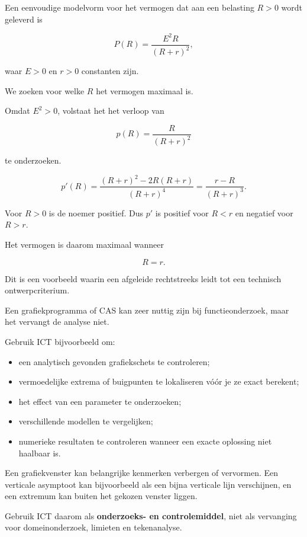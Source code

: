 \documentclass{ximera}
\begin{document}
\begin{voorbeeld}
Een eenvoudige modelvorm voor het vermogen dat aan een belasting
\(R>0\) wordt geleverd is

\[
P(R)=\frac{E^2R}{(R+r)^2},
\]

waar \(E>0\) en \(r>0\) constanten zijn.

We zoeken voor welke \(R\) het vermogen maximaal is.

Omdat \(E^2>0\), volstaat het het verloop van

\[
p(R)=\frac{R}{(R+r)^2}
\]

te onderzoeken.

\[
p'(R)
=
\frac{(R+r)^2-2R(R+r)}{(R+r)^4}
=
\frac{r-R}{(R+r)^3}.
\]

Voor \(R>0\) is de noemer positief. Dus \(p'\) is positief voor \(R<r\)
en negatief voor \(R>r\).

Het vermogen is daarom maximaal wanneer

\[
\boxed{R=r.}
\]

Dit is een voorbeeld waarin een afgeleide rechtstreeks leidt tot een
technisch ontwerpcriterium.
\end{voorbeeld}



Een grafiekprogramma of CAS kan zeer nuttig zijn bij functieonderzoek,
maar het vervangt de analyse niet.

Gebruik ICT bijvoorbeeld om:

\begin{itemize}
  \item een analytisch gevonden grafiekschets te controleren;
  \item vermoedelijke extrema of buigpunten te lokaliseren vóór je ze exact berekent;
  \item het effect van een parameter te onderzoeken;
  \item verschillende modellen te vergelijken;
  \item numerieke resultaten te controleren wanneer een exacte oplossing niet haalbaar is.
\end{itemize}

\begin{opmerking}
Een grafiekvenster kan belangrijke kenmerken verbergen of vervormen.
Een verticale asymptoot kan bijvoorbeeld als een bijna verticale lijn
verschijnen, en een extremum kan buiten het gekozen venster liggen.

Gebruik ICT daarom als \textbf{onderzoeks- en controlemiddel}, niet als
vervanging voor domeinonderzoek, limieten en tekenanalyse.
\end{opmerking}
\end{document}

